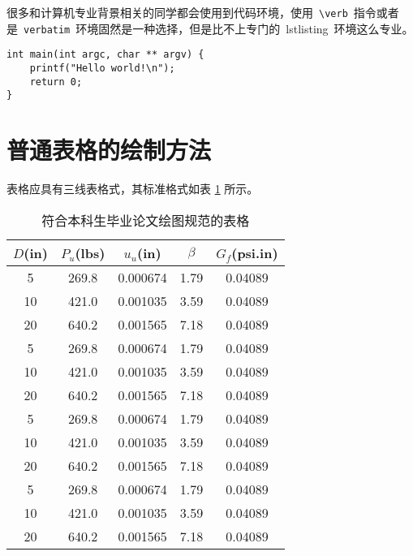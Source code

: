 很多和计算机专业背景相关的同学都会使用到代码环境，使用~\verb|\verb|~指令或者是~\verb|verbatim|~环境固然是一种选择，但是比不上专门的~lstlisting~环境这么专业。

\begin{lstlisting}
int main(int argc, char ** argv) {
    printf("Hello world!\n");
    return 0;
}
\end{lstlisting}

\section{普通表格的绘制方法}

表格应具有三线表格式，其标准格式如表 \ref{tab:table1} 所示。
\begin{table}[htbp]
\caption{符合本科生毕业论文绘图规范的表格}\label{tab:table1}
\vspace{0.5em}\centering\wuhao
\begin{tabular}{ccccc}
\toprule[1.5pt]
$D$(in) & $P_u$(lbs) & $u_u$(in) & $\beta$ & $G_f$(psi.in)\\
\midrule[1pt]
 5 & 269.8 & 0.000674 & 1.79 & 0.04089\\
10 & 421.0 & 0.001035 & 3.59 & 0.04089\\
20 & 640.2 & 0.001565 & 7.18 & 0.04089\\
 5 & 269.8 & 0.000674 & 1.79 & 0.04089\\
10 & 421.0 & 0.001035 & 3.59 & 0.04089\\
20 & 640.2 & 0.001565 & 7.18 & 0.04089\\
 5 & 269.8 & 0.000674 & 1.79 & 0.04089\\
10 & 421.0 & 0.001035 & 3.59 & 0.04089\\
20 & 640.2 & 0.001565 & 7.18 & 0.04089\\
 5 & 269.8 & 0.000674 & 1.79 & 0.04089\\
10 & 421.0 & 0.001035 & 3.59 & 0.04089\\
20 & 640.2 & 0.001565 & 7.18 & 0.04089\\
\bottomrule[1.5pt]
\end{tabular}
\vspace{\baselineskip}
\end{table}